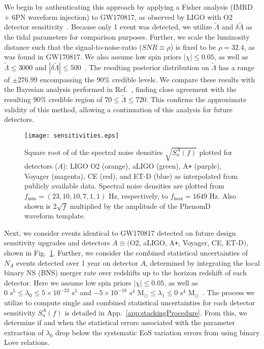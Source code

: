 \documentclass[prd,twocolumn,nofootinbib,superscriptaddress,amsmath,amssymb]{revtex4-1}
\begin{document}
We begin by authenticating this approach by applying a Fisher analysis (IMRD + 6PN waveform injection) to GW170817, as observed by LIGO with O2 detector sensitivity~\cite{aLIGO}.
Because only 1 event was detected, we utilize $\tilde\Lambda$ and $\delta\tilde\Lambda$ as the tidal parameters for comparison purposes.
Further, we scale the luminosity distance such that the signal-to-noise-ratio ($SNR \equiv \rho$) is fixed to be $\rho=32.4$, as was found in GW170817.
We also assume low spin priors $|\chi| \leq 0.05$, as well as $\tilde{\Lambda} \leq 3000$ and $|\delta \tilde{\Lambda}| \leq 500$~\cite{Wade:LambdaPriors}.
The resulting posterior distribution on $\tilde{\Lambda}$ has a range of $\pm 276.99$ encompassing the $90\%$ credible levels.
We compare these results with the Bayesian analysis performed in Ref.~\cite{TheLIGOScientific:2017qsa,Abbott2018}, finding close agreement with the resulting $90\%$ credible region of $70 \leq \tilde{\Lambda} \leq 720$.
This confirms the approximate validity of this method, allowing a continuation of this analysis for future detectors.
\begin{figure}
\begin{center} 
\texttt{[image: sensitivities.eps]}
\end{center}
\caption{
Square root of of the spectral noise densities $\sqrt{S_n^A(f)}$ plotted for detectors ($A$): LIGO O2 (orange), aLIGO (green), A\texttt{+} (purple), Voyager (magenta), CE (red), and ET-D (blue) as interpolated from publicly available data.
Spectral noise densities are plotted from $f_{\text{min}}=(23,10,10,7,1,1) \text{ Hz}$, respectively, to $f_{\text{max}}=1649 \text{ Hz}$.
Also shown is $2 \sqrt{f}$ multiplied by the amplitude of the PhenomD~\cite{PhenomDI,PhenomDII} waveform template.
}
\label{fig:sensitivities}
\end{figure}

Next, we consider events identical to GW170817 detected on future design sensitivity upgrades and detectors $A \equiv ($O2, aLIGO, A\texttt{+}, Voyager, CE, ET-D$)$, shown in Fig.~\ref{fig:sensitivities}.
Further, we consider the combined statistical uncertainties of $N_A$ events detected over 1 year on detector $A$, determined by integrating the local binary NS (BNS) merger rate over redshifts up to the horizon redshift of each detector.
Here we assume low spin priors $|\chi| \leq 0.05$, as well as $0 \text{ s}^5 \leq \lambda_0 \leq 5 \times 10^{-23} \text{ s}^5$ and $-5 \times 10^{-18} \text{ s}^4\text{ M}_{\odot} \leq \lambda_1 \leq 0 \text{ s}^4\text{ M}_{\odot}$~\cite{delPozzo:TaylorTidal}.
The process we utilize to compute single and combined statistical uncertainties for each detector sensitivity $S_n^A(f)$ is detailed in App.~\ref{app:stackingProcedure}.
From this, we determine if and when the statistical errors associated with the parameter extraction of $\lambda_0$ drop below the systematic EoS variation errors from using binary Love relations.
\end{document}
